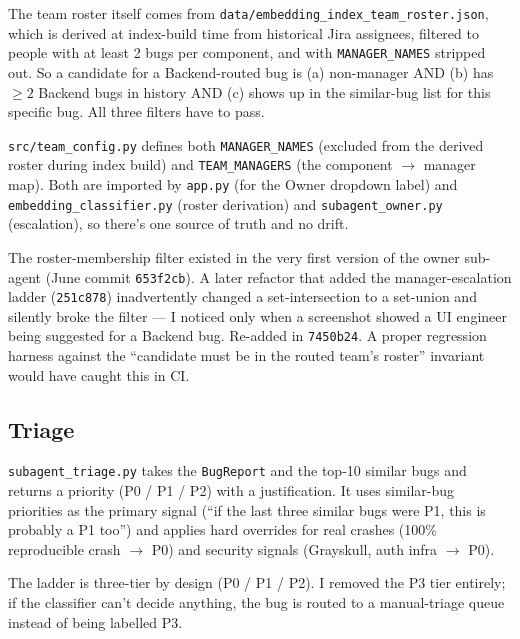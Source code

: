 \documentclass[11pt,a4paper]{article}
\begin{document}
The team roster itself comes from \texttt{data/embedding\_index\_team\_roster.json},
which is derived at index-build time from historical Jira assignees, filtered
to people with at least 2 bugs per component, and with \texttt{MANAGER\_NAMES}
stripped out. So a candidate for a Backend-routed bug is (a) non-manager AND
(b) has $\geq 2$ Backend bugs in history AND (c) shows up in the similar-bug
list for this specific bug. All three filters have to pass.

\begin{decisionbox}
\texttt{src/team\_config.py} defines both \texttt{MANAGER\_NAMES} (excluded
from the derived roster during index build) and \texttt{TEAM\_MANAGERS}
(the component $\rightarrow$ manager map). Both are imported by
\texttt{app.py} (for the Owner dropdown label) and
\texttt{embedding\_classifier.py} (roster derivation) and
\texttt{subagent\_owner.py} (escalation), so there's one source of truth
and no drift.
\end{decisionbox}

\begin{gotchabox}
The roster-membership filter existed in the very first version of the
owner sub-agent (June commit \texttt{653f2cb}). A later refactor that
added the manager-escalation ladder (\texttt{251c878}) inadvertently
changed a set-intersection to a set-union and silently broke the
filter --- I noticed only when a screenshot showed a UI engineer being
suggested for a Backend bug. Re-added in \texttt{7450b24}. A proper
regression harness against the ``candidate must be in the routed
team's roster'' invariant would have caught this in CI.
\end{gotchabox}

\subsection{Triage}

\texttt{subagent\_triage.py} takes the \texttt{BugReport} and the top-10
similar bugs and returns a priority (P0 / P1 / P2) with a justification. It
uses similar-bug priorities as the primary signal (``if the last three
similar bugs were P1, this is probably a P1 too'') and applies hard
overrides for real crashes (100\% reproducible crash $\rightarrow$ P0) and
security signals (Grayskull, auth infra $\rightarrow$ P0).

The ladder is three-tier by design (P0 / P1 / P2). I removed the P3 tier
entirely; if the classifier can't decide anything, the bug is routed to a
manual-triage queue instead of being labelled P3.
\end{document}
